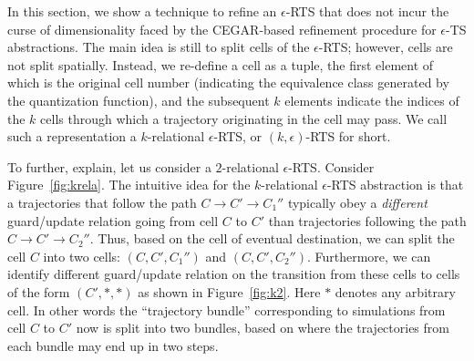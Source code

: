 % 
% 
% 

In this section, we show a technique to refine an $\epsilon$-RTS that
does not incur the curse of dimensionality faced by the CEGAR-based
refinement procedure for $\epsilon$-TS abstractions. The main idea is
still to split cells of the $\epsilon$-RTS; however, cells are not
split spatially.  Instead, we re-define a cell as a tuple, the first
element of which is the original cell number (indicating the
equivalence class generated by the quantization function), and the
subsequent $k$ elements indicate the indices of the $k$ cells through
which a trajectory originating in the cell may pass. We call such a
representation a $k$-relational $\epsilon$-RTS, or $(k,\epsilon)$-RTS
for short. 

To further, explain, let us consider a $2$-relational $\epsilon$-RTS.
Consider Figure~\ref{fig:krela}. The intuitive idea for the
$k$-relational $\epsilon$-RTS abstraction is that a trajectories that
follow the path $C \rightarrow C' \rightarrow C_1''$ typically obey a
{\em different} guard/update relation going from cell $C$ to $C'$ than
trajectories following the path $C \rightarrow C' \rightarrow C_2''$.
Thus, based on the cell of eventual destination, we can split the cell
$C$ into two cells: $(C,C',C_1'')$ and $(C,C',C_2'')$. Furthermore, we
can identify different guard/update relation on the transition from
these cells to cells of the form $(C',*,*)$ as shown in
Figure~\ref{fig:k2}. Here $*$ denotes any arbitrary cell. In other
words the ``trajectory bundle'' corresponding to simulations from cell
$C$ to $C'$ now is split into two bundles, based on where the
trajectories from each bundle may end up in two steps.


